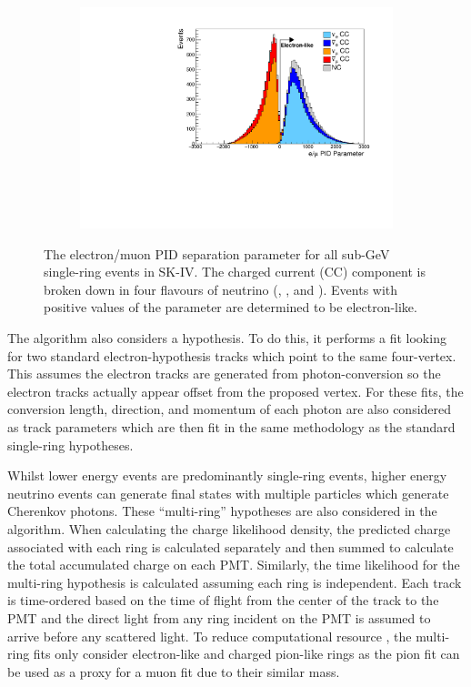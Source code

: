 \begin{figure}[h]
  \begin{subfigure}[t]{0.9\textwidth}
    \includegraphics[width=\textwidth, trim={0mm 0mm 0mm 0mm}, clip, page=1]{Figures/Simulations/PIDParameter.pdf}
  \end{subfigure}
  \caption{The electron/muon PID separation parameter for all sub-GeV single-ring events in SK-IV. The charged current (CC) component is broken down in four flavours of neutrino (\quickmath{\nu_{\mu}}, \quickmath{\bar{\nu}_{\mu}},  and ). Events with positive values of the parameter are determined to be electron-like.}
  \label{fig:Simulations_EMUPIDParamDistribution}
\end{figure}

The \fq algorithm also considers a  hypothesis. To do this, it performs a fit looking for two standard electron-hypothesis tracks which point to the same four-vertex. This assumes the electron tracks are generated from photon-conversion so the electron tracks actually appear offset from the proposed  vertex. For these fits, the conversion length, direction, and momentum of each photon are also considered as track parameters which are then fit in the same methodology as the standard single-ring hypotheses. 

Whilst lower energy events are predominantly single-ring events, higher energy neutrino events can generate final states with multiple particles which generate Cherenkov photons. These ``multi-ring'' hypotheses are also considered in the \fq algorithm. When calculating the charge likelihood density, the predicted charge associated with each ring is calculated separately and then summed to calculate the total accumulated charge on each PMT. Similarly, the time likelihood for the multi-ring hypothesis is calculated assuming each ring is independent. Each track is time-ordered based on the time of flight from the center of the track to the PMT and the direct light from any ring incident on the PMT is assumed to arrive before any scattered light. To reduce computational resource , the multi-ring fits only consider electron-like and charged pion-like rings as the pion fit can be used as a proxy for a muon fit due to their similar mass.

